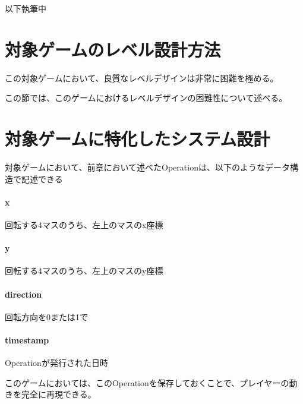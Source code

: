 以下執筆中


\section{対象ゲームのレベル設計方法}
この対象ゲームにおいて、良質なレベルデザインは非常に困難を極める。

この節では、このゲームにおけるレベルデザインの困難性について述べる。


\section{対象ゲームに特化したシステム設計}
対象ゲームにおいて、前章において述べたOperationは、以下のようなデータ構造で記述できる

\paragraph{x}
回転する4マスのうち、左上のマスのx座標
\paragraph{y}
回転する4マスのうち、左上のマスのy座標
\paragraph{direction}
回転方向を0または1で
\paragraph{timestamp}
Operationが発行された日時

このゲームにおいては、このOperationを保存しておくことで、プレイヤーの動きを完全に再現できる。
